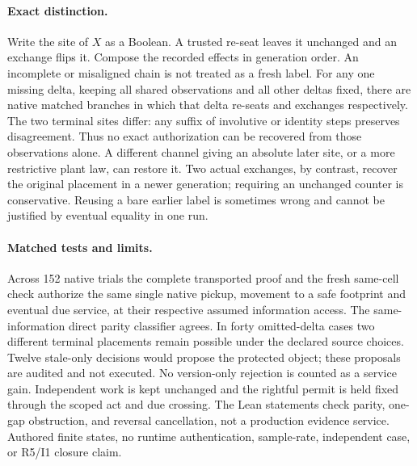 \documentclass[11pt]{article}
\begin{document}
\paragraph{Exact distinction.}
Write the site of $X$ as a Boolean. A trusted re-seat leaves it
unchanged and an exchange flips it. Compose the recorded effects
in generation order. An incomplete or misaligned chain is not
treated as a fresh label. For any one missing delta, keeping
all shared observations and all other deltas fixed, there are
native matched branches in which that delta re-seats and exchanges
respectively. The two terminal sites differ: any suffix of
involutive or identity steps preserves disagreement. Thus no
exact authorization can be recovered from those observations
alone. A different channel giving an absolute later site, or
a more restrictive plant law, can restore it.
Two actual exchanges, by contrast, recover the original
placement in a newer generation; requiring an unchanged counter
is conservative. Reusing a bare earlier label is sometimes
wrong and cannot be justified by eventual equality in one run.

\paragraph{Matched tests and limits.}
Across 152 native trials the complete transported proof and the
fresh same-cell check authorize the same single native pickup,
movement to a safe footprint and eventual due service, at their
respective assumed information access. The same-information
direct parity classifier agrees. In forty omitted-delta cases
two different terminal placements remain possible under the
declared source choices. Twelve stale-only decisions would
propose the protected object; these proposals are audited and
not executed. No version-only rejection is counted as a service
gain. Independent work is kept unchanged and the rightful
permit is held fixed through the scoped act and due crossing.
The Lean statements check parity, one-gap obstruction,
and reversal cancellation, not a production evidence service.
Authored finite states, no runtime authentication, sample-rate,
independent case, or R5/I1 closure claim.
\end{document}
